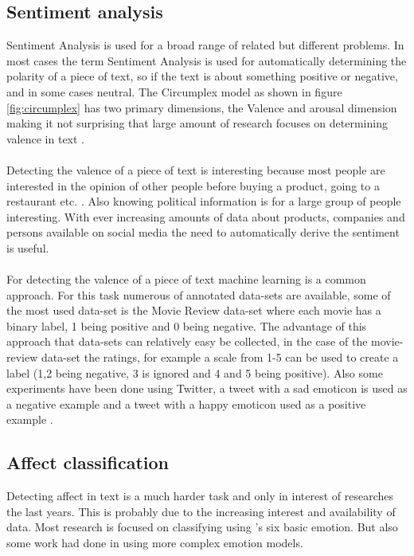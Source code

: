\documentclass[11pt]{article}
\begin{document}
\subsection{Sentiment analysis}
Sentiment Analysis is used for a broad range of related but different problems. In most cases the term Sentiment Analysis is used for automatically determining the polarity of a piece of text, so if the text is about something positive or negative, and in some cases neutral. The Circumplex model as shown in figure \ref{fig:circumplex} has two primary dimensions, the Valence and arousal dimension making it not surprising that large amount of research focuses on determining valence in text \cite{pang2005seeing}.\\\\
Detecting the valence of a piece of text is interesting because most people are interested in the opinion of other people before buying a product, going to a restaurant etc. \cite{pang2008opinion}. Also knowing political information is for a large group of people interesting. With ever increasing amounts of data about products, companies and persons available on social media the need to automatically derive the sentiment is useful.\\\\
For detecting the valence of a piece of text machine learning is a common approach. For this task numerous of annotated data-sets are available, some of the most used data-set is the Movie Review data-set \cite{pang2002thumbs} where each movie has a binary label, 1 being positive and 0 being negative. The advantage of this approach that data-sets can relatively easy be collected, in the case of the movie-review data-set the ratings, for example a scale from 1-5 can be used to create a label (1,2 being negative, 3 is ignored and 4 and 5 being positive). Also some experiments have been done using Twitter, a tweet with a sad emoticon is used as a negative example and a tweet with a happy emoticon used as a positive example \cite{mohammad2015using}.

\subsection{Affect classification}
Detecting affect in text is a much harder task and only in interest of researches the last years. This is probably due to the increasing interest and availability of data. Most research is focused on classifying using 's six basic emotion. But also some work had done in using more complex emotion models.
\end{document}
